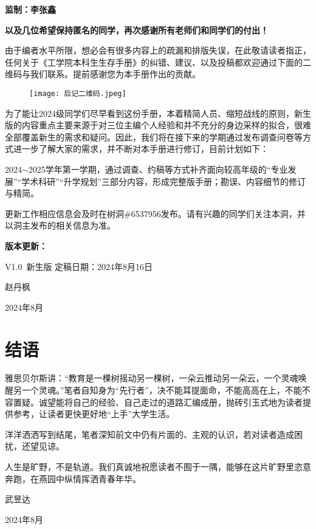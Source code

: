 \documentclass[11pt,oneside]{book}
\begin{document}
\textbf{监制：李张鑫}

\textbf{以及几位希望保持匿名的同学，再次感谢所有老师们和同学们的付出！}
 

由于编者水平所限，想必会有很多内容上的疏漏和排版失误，在此敬请读者指正，任何关于《工学院本科生生存手册》的纠错、建议、以及投稿都欢迎通过下面的二维码与我们联系。提前感谢您为本手册作出的贡献。
\begin{figure}[htbp]
    \centering
    \texttt{[image: 后记二维码.jpeg]}
\end{figure}

为了能让2024级同学们尽早看到这份手册，本着精简人员、缩短战线的原则，新生版的内容重点主要来源于对三位主编个人经验和并不充分的身边采样的拟合，很难全部覆盖新生的需求和疑问。因此，我们将在接下来的学期通过发布调查问卷等方式进一步了解大家的需求，并不断对本手册进行修订，目前计划如下：

2024$\sim$2025学年第一学期，通过调查、约稿等方式补齐面向较高年级的“专业发展”“学术科研”“升学规划”三部分内容，形成完整版手册；勘误、内容细节的修订与精简。

更新工作相应信息会及时在树洞\#6537956发布。请有兴趣的同学们关注本洞，并以洞主发布的相关信息为准。

\textbf{版本更新：}

V1.0\ 新生版 定稿日期：2024年8月16日

\begin{flushright}
    赵丹枫

    2024年8月
\end{flushright}
\chapter*{结语}
雅思贝尔斯讲：“教育是一棵树摇动另一棵树，一朵云推动另一朵云，一个灵魂唤醒另一个灵魂。”笔者自知身为“先行者”，决不能耳提面命，不能高高在上，不能不容置疑。诚望能将自己的经验、自己走过的道路汇编成册，抛砖引玉式地为读者提供参考，让读者更快更好地“上手”大学生活。

洋洋洒洒写到结尾，笔者深知前文中仍有片面的、主观的认识，若对读者造成困扰，还望见谅。

人生是旷野，不是轨道。我们真诚地祝愿读者不囿于一隅，能够在这片旷野里恣意奔跑，在燕园中纵情挥洒青春年华。

\begin{flushright}
    武昱达

    2024年8月
\end{flushright}
\end{document}

